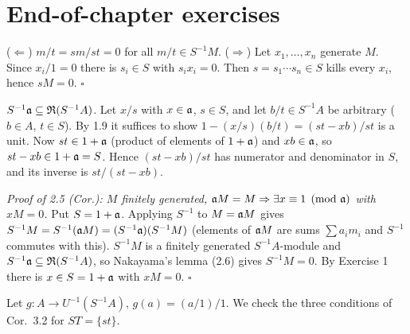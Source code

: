 \documentclass[11pt]{article}
\begin{document}
\section*{End-of-chapter exercises}

\pf
($\Leftarrow$) $m/t=sm/st=0$ for all $m/t\in S^{-1}M$.
($\Rightarrow$) Let $x_1,\dots,x_n$ generate $M$. Since $x_i/1=0$ there is $s_i\in S$ with $s_ix_i=0$. Then $s=s_1\cdots s_n\in S$ kills every $x_i$, hence $sM=0$. \hfill$\square$

\pf
\emph{$S^{-1}\mathfrak a\subseteq\mathfrak R(S^{-1}A)$.} Let $x/s$ with $x\in\mathfrak a$, $s\in S$, and let $b/t\in S^{-1}A$ be arbitrary ($b\in A$, $t\in S$). By 1.9 it suffices to show $1-(x/s)(b/t)=(st-xb)/st$ is a unit. Now $st\in1+\mathfrak a$ (product of elements of $1+\mathfrak a$) and $xb\in\mathfrak a$, so $st-xb\in1+\mathfrak a=S$. Hence $(st-xb)/st$ has numerator and denominator in $S$, and its inverse is $st/(st-xb)$.

\emph{Proof of 2.5 (Cor.): $M$ finitely generated, $\mathfrak a M=M\Rightarrow\exists x\equiv1\pmod{\mathfrak a}$ with $xM=0$.} Put $S=1+\mathfrak a$. Applying $S^{-1}$ to $M=\mathfrak a M$ gives $S^{-1}M=S^{-1}(\mathfrak a M)=(S^{-1}\mathfrak a)(S^{-1}M)$ (elements of $\mathfrak a M$ are sums $\sum a_im_i$ and $S^{-1}$ commutes with this). $S^{-1}M$ is a finitely generated $S^{-1}A$-module and $S^{-1}\mathfrak a\subseteq\mathfrak R(S^{-1}A)$, so Nakayama's lemma (2.6) gives $S^{-1}M=0$. By Exercise 1 there is $x\in S=1+\mathfrak a$ with $xM=0$. \hfill$\square$

\pf
Let $g:A\to U^{-1}(S^{-1}A)$, $g(a)=(a/1)/1$. We check the three conditions of Cor.\ 3.2 for $ST=\{st\}$.
\end{document}
